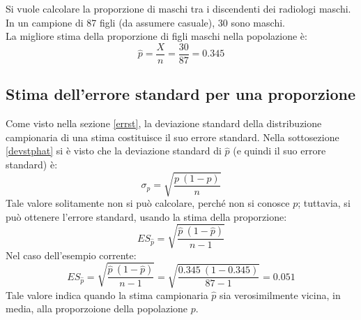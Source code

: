 \documentclass[drafts, 10pt]{book}
\newcounter{example}[section]
\begin{document}
\begin{example}
    Si vuole calcolare la proporzione di maschi tra i discendenti dei radiologi maschi.
    \\
    In un campione di 87 figli (da assumere casuale), 30 sono maschi.
    \\
    La migliore stima della proporzione di figli maschi nella popolazione è:
    \begin{equation}
    \hat{p} = \frac{X}{n} = \frac{30}{87} = 0.345
    \end{equation}

    \subsection{Stima dell'errore standard per una proporzione}
    Come visto nella sezione \ref{errst}, la deviazione standard della distribuzione campionaria di una stima costituisce il suo errore standard. Nella sottosezione \ref{devstphat} si è visto che la deviazione standard di $\hat{p}$ (e quindi il suo errore standard) è:
    \begin{equation}
    \sigma_{\hat{p}} = \sqrt{\frac{p \ (1-p)}{n}}
    \end{equation}
    Tale valore solitamente non si può calcolare, perché non si conosce $p$; tuttavia, si può ottenere l'errore standard, usando la stima della proporzione:
    \begin{equation}
    ES_{\hat{p}} = \sqrt{\frac{\hat{p} \ (1-\hat{p})}{n-1}}
    \end{equation}
    Nel caso dell'esempio corrente:
    \begin{equation}
    ES_{\hat{p}} = \sqrt{\frac{\hat{p} \ (1-\hat{p})}{n-1}} = \sqrt{\frac{0.345 \ (1-0.345)}{87-1}} = 0.051
    \end{equation}
    Tale valore indica quando la stima campionaria $\hat{p}$ sia verosimilmente vicina, in media, alla proporzoione della popolazione $p$.


\end{example}
\end{document}
